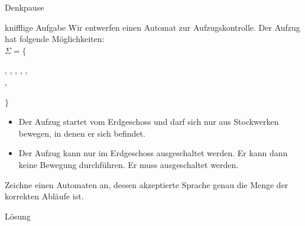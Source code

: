 \documentclass[10pt]{beamer}
\begin{document}
{
\begin{frame}{Denkpause}
\begin{small}
    \begin{alertblock}{knifflige Aufgabe}
    Wir entwerfen einen Automat zur Aufzugskontrolle.
    Der Aufzug hat folgende Möglichkeiten:\\
    $\Sigma =\{$\begin{footnotesize}
     ,  ,  ,  ,  , \\\qquad\quad\; , 
    \end{footnotesize}$\}$
    \begin{itemize}
        \item Der Aufzug startet vom Erdgeschoss und darf sich nur aus Stockwerken bewegen, in denen er sich befindet.
        \item Der Aufzug kann nur im Erdgeschoss ausgeschaltet werden. Er kann dann keine Bewegung durchführen. Er muss ausgeschaltet werden.
    \end{itemize}
    \end{alertblock}
    \alert{Zeichne einen Automaten an, dessen akzeptierte Sprache genau die Menge der korrekten Abläufe ist.}
    \end{small}
\end{frame}

\begin{frame}{Lösung}
\begin{center}
\end{center}
\end{frame}
}
\end{document}
